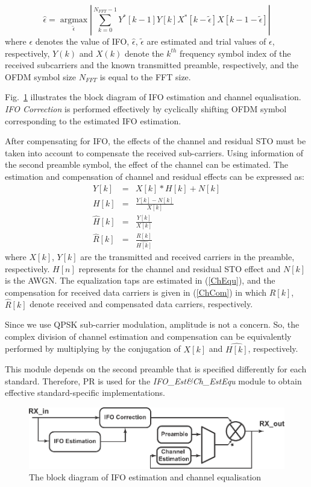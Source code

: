 \begin{equation}
\label{integerCFO}
\hat{\epsilon} =\underset{\tilde{\epsilon}}{\operatorname{argmax}}  \left|\sum_{k=0}^{N_{FFT}-1} Y^{*}[k-1] Y[k]  X^{*}[k-\tilde{\epsilon}]  X[k-1-\tilde{\epsilon}]\right|
\end{equation}
where $\epsilon$ denotes the value of IFO, $\hat{\epsilon}$, $\tilde{\epsilon}$ are estimated and trial values of $\epsilon$, respectively,
$Y(k)$ and $X(k)$ denote the $k^{th}$ frequency symbol index of the received subcarriers and the known transmitted preamble, respectively, and the OFDM symbol size $N_{FFT}$ is equal to the FFT size.

Fig.~\ref{fig:IFO} illustrates the block diagram of IFO estimation and channel equalisation.
\emph{IFO Correction} is performed effectively by cyclically shifting OFDM symbol corresponding to the estimated IFO estimation.

After compensating for IFO, the effects of the channel and residual STO must be taken into account to compensate the received sub-carriers.
Using information of the second preamble symbol, the effect of the channel can be estimated.
The estimation and compensation of channel and residual effects can be expressed as:
\begin{eqnarray}
\label{ChEqu}
Y[k] &=& X[k] * H[k] + N[k] \nonumber \\
H[k] &=& \frac{Y[k]-N[k]}{X[k]} \nonumber \\
\hat{H}[k] &=& \frac{Y[k]}{X[k]}\\
\label{ChCom}
\hat{R}[k] &=& \frac{R[k]}{\hat{H[k]}}
\end{eqnarray}
where $X[k]$, $Y[k]$ are the transmitted and received carriers in the preamble, respectively.
$H[n]$ represents for the channel and residual STO effect and $N[k]$ is the AWGN.
The equalization taps are estimated in (\ref{ChEqu}), and the compensation for received data carriers is given in (\ref{ChCom})
in which $R[k]$, $\hat{R}[k]$ denote received and compensated data carriers, respectively.

Since we use QPSK sub-carrier modulation, amplitude is not a concern. So, the complex division of channel estimation and compensation can be equivalently performed by multiplying by the conjugation of $X[k]$ and $\hat{H[k]}$, respectively.

This module depends on the second preamble that is specified differently for each standard.
Therefore, PR is used for the \emph{IFO\_Est\&Ch\_EstEqu} module to obtain effective standard-specific implementations.
\begin{figure}
\centering
\includegraphics [width=0.9\columnwidth]{Figures/MSCR_RX_IFOCh.pdf}
\caption{The block diagram of IFO estimation and channel equalisation}
\label{fig:IFO}
\end{figure}

